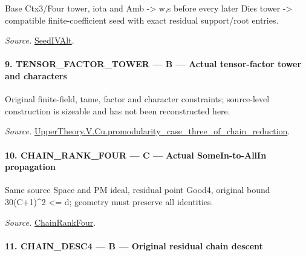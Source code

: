 Base Ctx3/Four tower, iota and Amb -> w,s before every later Dies tower -> compatible finite-coefficient seed with exact residual support/root entries.

\emph{Source.} \href{https://github.com/CocoSgt/riemann-hypothesis-lean/blob/7cbf7a0c32fca1badf05931879a37c3f8a2b03b4/src/Development/AutomorphicArithmetic/AutomorphicVarieties/ModularityArgument/ThresholdArguments/DenseThresholdCases/PromodularityCaseThree.lean#L19-L25}{SeedIVAlt}.



\paragraph{9. TENSOR\_\allowbreak FACTOR\_\allowbreak TOWER — B — Actual tensor-factor tower and characters}

Original finite-field, tame, factor and character constraints; source-level construction is sizeable and has not been reconstructed here.

\emph{Source.} \href{https://github.com/CocoSgt/riemann-hypothesis-lean/blob/7cbf7a0c32fca1badf05931879a37c3f8a2b03b4/src/Development/AutomorphicArithmetic/AutomorphicVarieties/ModularityArgument/ThresholdArguments/DenseThresholdCases/PromodularityCaseThreeOfLemmas.lean#L131-L153}{UpperTheory.V.Cu.promodularity\_\allowbreak case\_\allowbreak three\_\allowbreak of\_\allowbreak chain\_\allowbreak reduction}.



\paragraph{10. CHAIN\_\allowbreak RANK\_\allowbreak FOUR — C — Actual SomeIn-to-AllIn propagation}

Same source Space and PM ideal, residual point Good4, original bound 30(C+1)\textasciicircum{}2 <= d; geometry must preserve all identities.

\emph{Source.} \href{https://github.com/CocoSgt/riemann-hypothesis-lean/blob/7cbf7a0c32fca1badf05931879a37c3f8a2b03b4/src/Development/AutomorphicArithmetic/AutomorphicVarieties/ModularityArgument/ThresholdArguments/DenseThresholdCases/PromodularityCaseThree.lean#L26-L32}{ChainRankFour}.



\paragraph{11. CHAIN\_\allowbreak DESC4 — B — Original residual chain descent}

